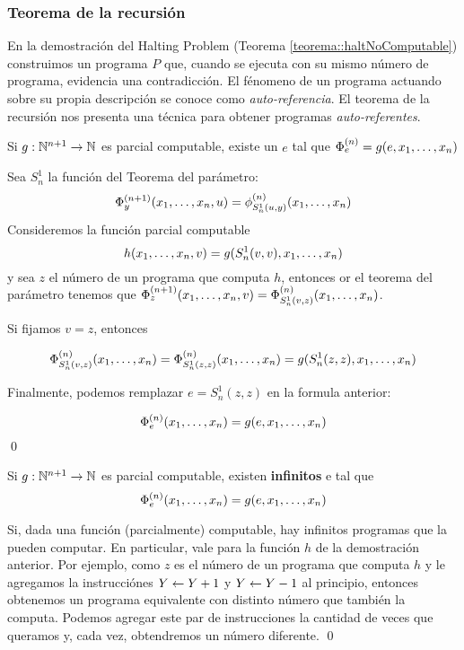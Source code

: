 \subsubsection{Teorema de la recursión}
En la demostración del Halting Problem (Teorema \ref{teorema::haltNoComputable}) construimos un programa $P$ que, cuando se ejecuta con su mismo número de programa, evidencia una contradicción. El fénomeno de un programa actuando sobre su propia descripción se conoce como \textit{auto-referencia}. El teorema de la recursión nos presenta una técnica para obtener programas \textit{auto-referentes}.	

\begin{teorema}\label{teorema::recursion}
	Si $g:\mathbb{N}^{n+1}\to\mathbb{N}$ es parcial computable, existe un $e$ tal que $\Phi_e^{(n)} = g(e,x_1,\dots, x_{n})$
\end{teorema}

\begin{demo}
	Sea $S_n^1$ la función del Teorema del parámetro:
	$$\Phi_y^{(n+1)}(x_1,\dots, x_{n},u) = \phi_{S_n^1(u,y)}^{(n)}(x_1,\dots, x_{n})$$
	Consideremos la función parcial computable $$h(x_1,\dots, x_{n}, v) = g(S_n^1(v,v),x_1,\dots, x_{n})$$ y sea $z$ el número de un programa que computa $h$, entonces or el teorema del parámetro tenemos que $\Phi_z^{(n+1)}(x_1,\dots, x_{n}, v) = \Phi_{S_n^1(v,z)}^{(n)}(x_1,\dots, x_{n})$.

	Si fijamos $v = z$, entonces\\
\end{demo}
\begin{demoPart}
 $$\Phi_{S_n^1(v,z)}^{(n)}(x_1,\dots, x_{n}) = \Phi_{S_n^1(z,z)}^{(n)}(x_1,\dots, x_{n}) = g(S_n^1(z,z),x_1,\dots, x_{n})$$

	Finalmente, podemos remplazar $e = S_n^1(z,z)$ en la formula anterior:
	
	$$\Phi_{e}^{(n)}(x_1,\dots, x_{n}) = g(e,x_1,\dots, x_{n})$$\qed
\end{demoPart}

\begin{corolario}\label{corolario::infintosERecursion}
	Si $g:\mathbb{N}^{n+1}\to\mathbb{N}$ es parcial computable, existen \textbf{infinitos} e tal que $$\Phi_e^{(n)}(x_1,\dots, x_{n}) = g(e,x_1,\dots, x_{n})$$
\end{corolario}

\begin{demo}
	Si, dada una función (parcialmente) computable, hay infinitos programas que la pueden computar. En particular, vale para la función $h$ de la demostración anterior. Por ejemplo, como $z$ es el número de un programa que computa $h$ y le agregamos la instrucciónes $Y \leftarrow Y + 1$ y $Y \leftarrow Y - 1$ al principio, entonces obtenemos un programa equivalente con distinto número que también la computa. Podemos agregar este par de instrucciones la cantidad de veces que queramos y, cada vez, obtendremos un número diferente. \qed
\end{demo}
